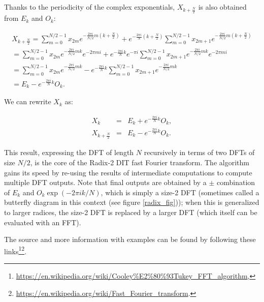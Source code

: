 \documentclass[12pt]{article}
\theoremstyle{plain}
\begin{document}
Thanks to the periodicity of the complex exponentials, $X_{k+\frac{N}{2}}$ is also obtained from $E_k$ and $O_k$:

\begin{equation}
\begin{split}
X_{k + \frac{N}{2}} =  \sum \limits_{m=0}^{N/2-1} x_{2m} e^{-\frac{2\pi i}{N/2} m(k + \frac{N}{2})} +  e^{-\frac{2\pi i}{N}(k + \frac{N}{2})} \sum \limits_{m=0}^{N/2-1} x_{2m+1} e^{-\frac{2\pi i}{N/2} m(k + \frac{N}{2} )} \\  =  \sum \limits_{m=0}^{N/2-1} x_{2m}   e^{-\frac{2\pi i}{N/2} mk} e^{-2\pi m i} +  e^{-\frac{2\pi i}{N}k}e^{-\pi i} \sum \limits_{m=0}^{N/2-1} x_{2m+1} e^{-\frac{2\pi i}{N/2} mk} e^{-2\pi m i} \\ =  \sum \limits_{m=0}^{N/2-1} x_{2m}  e^{-\frac{2\pi i}{N/2} mk} - e^{-\frac{2\pi i}{N}k} \sum \limits_{m=0}^{N/2-1} x_{2m+1} e^{-\frac{2\pi i}{N/2} mk} \\ =  E_k - e^{-\frac{2\pi i}{N}k} O_k.
\end{split}
\end{equation}

We can rewrite $X_k$ as:

\begin{equation}
\begin{matrix}
X_k & =
& E_k + e^{-\frac{2\pi i}{N}k} O_k, \\
X_{k+\frac{N}{2}} & =
& E_k - e^{-\frac{2\pi i}{N}{k}} O_k.
\end{matrix}
\end{equation}

This result, expressing the DFT of length $N$ recursively in terms of two DFTs of size $N/2$, is the core of the Radix-2 DIT fast Fourier transform. The algorithm gains its speed by re-using the results of intermediate computations to compute multiple DFT outputs.  Note that final outputs are obtained by a $\pm$ combination of $E_k$ and $O_k \exp(-2\pi i k/N)$, which is simply a size-2 DFT (sometimes called a butterfly diagram in this context (see figure \ref{radix_fig})); when this is generalized to larger radices, the size-2 DFT is replaced by a larger DFT (which itself can be evaluated with an FFT).

The source and more information with examples can be found by following these links\footnote{\url{https://en.wikipedia.org/wiki/Cooley\%E2\%80\%93Tukey_FFT_algorithm},}\footnote{\url{https://en.wikipedia.org/wiki/Fast_Fourier_transform}.}.
\newpage
\end{document}
